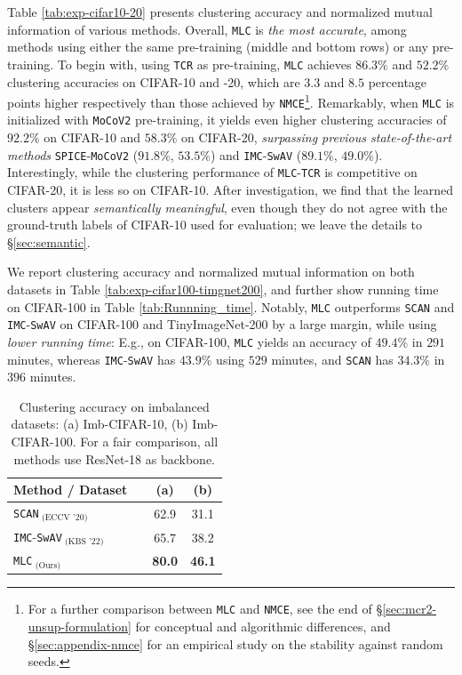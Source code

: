 \documentclass[10pt,twocolumn,letterpaper]{article}
\newcommand{\ours}{MLC}
\newcommand{\mours}{\texttt{\ours}}
\begin{document}
   Table \ref{tab:exp-cifar10-20} presents clustering accuracy and normalized mutual information of various methods. Overall, \mours{} is \textit{the most accurate}, among methods using either the same pre-training (middle and bottom rows) or any pre-training. To begin with, using \texttt{TCR} as pre-training, \mours{} achieves $86.3\%$ and $52.2\%$ clustering accuracies on CIFAR-10 and -20, which are $3.3$ and $8.5$ percentage points higher respectively than those achieved by \texttt{NMCE}\footnote{
  For a further comparison between \mours{} and \texttt{NMCE}, see the end of \S \ref{sec:mcr2-unsup-formulation} for conceptual and algorithmic differences, and \S \ref{sec:appendix-nmce} for an empirical study on the stability against random seeds.}. Remarkably, when \mours{} is initialized with \texttt{MoCoV2} pre-training, it yields even higher clustering accuracies of $92.2\%$ on CIFAR-10 and $58.3\%$ on CIFAR-20, \textit{surpassing previous state-of-the-art methods} \texttt{SPICE}-\texttt{MoCoV2} ($91.8\%$, $53.5\%$) and \texttt{IMC}-\texttt{SwAV} ($89.1\%$, $49.0\%$). Interestingly, while the clustering performance of \mours{}-\texttt{TCR} is competitive on CIFAR-20, it is less so on CIFAR-10. After investigation, we find that the learned clusters appear \textit{semantically meaningful}, even though they do not agree with the ground-truth labels of CIFAR-10 used for evaluation; we leave the details to \S \ref{sec:semantic}.


     We report clustering accuracy and normalized mutual information on both datasets in Table \ref{tab:exp-cifar100-timgnet200}, and further show running time on CIFAR-100 in Table \ref{tab:Runnning_time}. Notably, \mours{} outperforms \texttt{SCAN} and \texttt{IMC}-\texttt{SwAV} on CIFAR-100 and TinyImageNet-200 by a large margin, while using \textit{lower running time}: E.g., on CIFAR-100, \mours{} yields an accuracy of $49.4\%$ in $291$ minutes, whereas \texttt{IMC}-\texttt{SwAV} has $43.9\%$ using $529$ minutes, and \texttt{SCAN} has $34.3\%$ in $396$ minutes. 

   
   
   
   
   
 
  
  \begin{table}[t]
    \centering
    \caption{Clustering accuracy on imbalanced datasets: (a) Imb-CIFAR-10, (b) Imb-CIFAR-100. For a fair comparison, all methods use ResNet-18 as backbone.  }
    \label{tab:Imbalance_data}
    \begin{tabular}{@{}lccc@{}}
    \toprule
    Method / Dataset &  & (a) & (b) \\
    \midrule
    \texttt{SCAN}$_\text{ (ECCV '20)}$ &  & 62.9 & 31.1 \\
    \texttt{IMC}-\texttt{SwAV}$_{\text{ (KBS '22)}}$ &  & 65.7 & 38.2  \\
    \mours$_{\text{ (Ours)}}$ &  & \textbf{80.0} & \textbf{46.1} \\
    \bottomrule
    \end{tabular}%
  \end{table}
   
\end{document}
